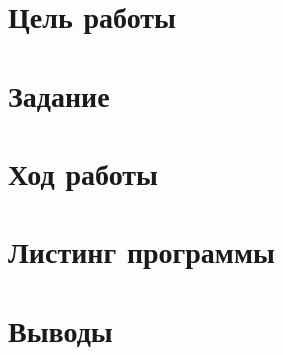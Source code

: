 


	
	
	\section*{Цель работы}
	
	\section*{Задание}
	
	\newpage
	\section*{Ход работы}
	
	\newpage
	\section*{Листинг программы}
	
	\newpage
	\section*{Выводы}
	
